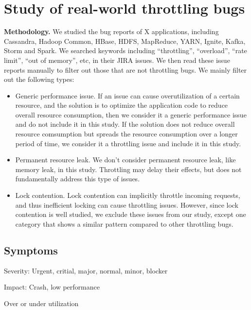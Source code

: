 \section{Study of real-world throttling bugs}

\vspace{.1in}
\noindent
\textbf{Methodology.} We studied the bug reports of X applications, including Cassandra, Hadoop Common, 
HBase, HDFS, MapReduce, YARN, Ignite, Kafka, Storm and Spark. We searched keywords including ``throttling'', ``overload'',
``rate limit'', ``out of memory'', etc, in their JIRA issues. We then read these issue reports manually to filter out those
that are not throttling bugs. We mainly filter out the following types:

\begin{itemize}

\item Generic performance issue. If an issue can cause overutilization of a certain resource, and the solution is to
optimize the application code to reduce overall resource consumption, then we consider it a generic performance issue
and do not include it in this study. If the
solution does not reduce overall resource comsumption but spreads the resource consumption over a longer period
of time, we consider it a throttling issue and include it in this study.

\item Permanent resource leak. We don't consider permanent resource leak, like memory leak, in this study. Throttling
may delay their effects, but does not fundamentally address this type of issues.

\item Lock contention. Lock contention can implicitly throttle incoming requests, and thus inefficient locking can cause throttling
issues. However, since lock contention is well studied, we exclude these issues from our study, except one category that
shows a similar pattern compared to other throttling bugs.

\end{itemize}

\subsection{Symptoms}

Severity: Urgent, critial, major, normal, minor, blocker

Impact: Crash, low performance

Over or under utilization

